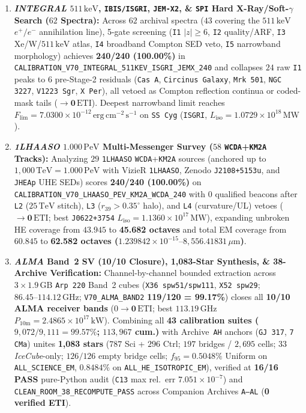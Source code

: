 \documentclass[twocolumn,10pt]{article}
\begin{document}
\begin{enumerate}\setlength{\itemsep}{2pt}\setlength{\parskip}{0pt}
  \item \textbf{\textit{INTEGRAL} $511\,\mathrm{keV}$, \texttt{IBIS/ISGRI}, \texttt{JEM-X2}, \& \texttt{SPI} Hard X-Ray/Soft-$\gamma$ Search ($62$ Spectra):} Across $62$ archival spectra ($43$ covering the $511\,\mathrm{keV}$ $e^+/e^-$ annihilation line), 5-gate screening (\texttt{I1} $|z|\ge 6$, \texttt{I2} quality/ARF, \texttt{I3} Xe/W/$511\,\mathrm{keV}$ atlas, \texttt{I4} broadband Compton SED veto, \texttt{I5} narrowband morphology) achieves \textbf{240/240 (100.00\%)} in \texttt{CALIBRATION\_V70\_INTEGRAL\_511KEV\_ISGRI\_JEMX\_240} and collapses $24$ raw \texttt{I1} peaks to $6$ pre-Stage-2 residuals (\texttt{Cas\,A}, \texttt{Circinus\,Galaxy}, \texttt{Mrk\,501}, \texttt{NGC\,3227}, \texttt{V1223\,Sgr}, \texttt{X\,Per}), all vetoed as Compton reflection continua or coded-mask tails ($\rightarrow \mathbf{0\,\mathrm{ETI}}$). Deepest narrowband limit reaches \textbf{$F_{\mathrm{lim}} = 7.0300\times 10^{-12}\,\mathrm{erg\,cm^{-2}\,s^{-1}}$} on \texttt{SS\,Cyg} (\texttt{ISGRI}, $L_{\mathrm{iso}} = 1.0729\times 10^{18}\,\mathrm{MW}$).
  \item \textbf{\textit{1LHAASO} $1.000\,\mathrm{PeV}$ Multi-Messenger Survey ($58$ \texttt{WCDA}+\texttt{KM2A} Tracks):} Analyzing $29$ \texttt{1LHAASO} \texttt{WCDA}+\texttt{KM2A} sources (anchored up to $1{,}000\,\mathrm{TeV} = 1.000\,\mathrm{PeV}$ with VizieR \texttt{1LHAASO}, Zenodo \texttt{J2108+5153u}, and \texttt{JHEAp} UHE SEDs) scores \textbf{240/240 (100.00\%)} on \texttt{CALIBRATION\_V70\_LHAASO\_PEV\_KM2A\_WCDA\_240} with $0$ qualified beacons after \texttt{L2} ($25\,\mathrm{TeV}$ stitch), \texttt{L3} ($r_{39} > 0.35^\circ$ halo), and \texttt{L4} (curvature/UL) vetoes ($\rightarrow \mathbf{0\,\mathrm{ETI}}$; best \texttt{J0622+3754} $L_{\mathrm{iso}} = 1.1360\times 10^{17}\,\mathrm{MW}$), expanding unbroken HE coverage from $43.945$ to \textbf{45.682 octaves} and total EM coverage from $60.845$ to \textbf{62.582 octaves ($1.239842\times 10^{-15}\text{--}8{,}556.41831\,\mu\text{m}$)}.
  \item \textbf{\textit{ALMA} Band~2 SV (10/10 Closure), 1,083-Star Synthesis, \& 38-Archive Verification:} Channel-by-channel bounded extraction across $3 \times 1.9\,\mathrm{GB}$ \texttt{Arp\,220} Band~2 cubes (\texttt{X36 spw51/spw111}, \texttt{X52 spw29}; $86.45\text{--}114.12\,\mathrm{GHz}$; \texttt{V70\_ALMA\_BAND2} \textbf{119/120 = 99.17\%}) closes all \textbf{10/10 ALMA receiver bands} ($0\rightarrow \mathbf{0\,\mathrm{ETI}}$; best $113.19\,\mathrm{GHz}$ $P_{10\mathrm{m}} = 2.4865\times 10^{17}\,\mathrm{kW}$). Combining all \textbf{43 calibration suites ($9{,}072/9{,}111 = 99.57\%$; $113{,}967$ cum.)} with Archive~\texttt{AH} anchors (\texttt{GJ\,317}, \texttt{7\,CMa}) unites \textbf{1,083 stars} ($787$ Sci + $296$ Ctrl; $197$ bridges / $2{,}695$ cells; $33$ \textit{IceCube}-only; $126/126$ empty bridge cells; $f_{95} = \mathbf{0.5048\%}$ Uniform on \texttt{ALL\_SCIENCE\_EM}, $\mathbf{0.8484\%}$ on \texttt{ALL\_HE\_ISOTROPIC\_EM}), verified at \textbf{16/16 PASS} pure-Python audit (\texttt{C13} max rel.\ err $7.051\times 10^{-7}$) and \texttt{CLEAN\_ROOM\_38\_RECOMPUTE\_PASS} across Companion Archives \texttt{A--AL} (\textbf{0 verified ETI}).

\end{enumerate}
\end{document}
